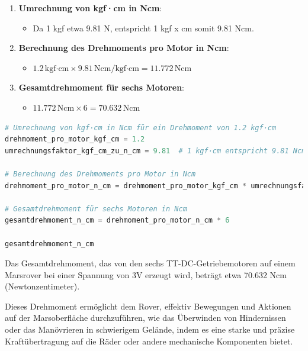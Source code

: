 \documentclass{vorlage-design-main}
\begin{document}
\begin{enumerate}
\def\labelenumi{\arabic{enumi}.}

\item
  \textbf{Umrechnung von kgf·cm in Ncm}:

  \begin{itemize}
  
  \item
    Da 1 kgf etwa 9.81 N, entspricht 1 kgf x cm somit 9.81 Ncm.
  \end{itemize}
\item
  \textbf{Berechnung des Drehmoments pro Motor in Ncm}:

  \begin{itemize}
  
  \item
    $1.2 \, \text{kgf·cm} \times 9.81 \, \text{Ncm/kgf·cm} = 11.772 \, \text{Ncm}$
  \end{itemize}
\item
  \textbf{Gesamtdrehmoment für sechs Motoren}:

  \begin{itemize}
  
  \item
    $11.772 \, \text{Ncm} \times 6 = 70.632 \, \text{Ncm}$
  \end{itemize}
\end{enumerate}

\begin{lstlisting}[language=Python]
# Umrechnung von kgf·cm in Ncm für ein Drehmoment von 1.2 kgf·cm
drehmoment_pro_motor_kgf_cm = 1.2
umrechnungsfaktor_kgf_cm_zu_n_cm = 9.81  # 1 kgf·cm entspricht 9.81 Ncm

# Berechnung des Drehmoments pro Motor in Ncm
drehmoment_pro_motor_n_cm = drehmoment_pro_motor_kgf_cm * umrechnungsfaktor_kgf_cm_zu_n_cm

# Gesamtdrehmoment für sechs Motoren in Ncm
gesamtdrehmoment_n_cm = drehmoment_pro_motor_n_cm * 6

gesamtdrehmoment_n_cm
\end{lstlisting}

Das Gesamtdrehmoment, das von den sechs TT-DC-Getriebemotoren auf einem
Marsrover bei einer Spannung von 3V erzeugt wird, beträgt etwa 70.632
Ncm (Newtonzentimeter).

Dieses Drehmoment ermöglicht dem Rover, effektiv Bewegungen und Aktionen
auf der Marsoberfläche durchzuführen, wie das Überwinden von
Hindernissen oder das Manövrieren in schwierigem Gelände, indem es eine
starke und präzise Kraftübertragung auf die Räder oder andere
mechanische Komponenten bietet.
\end{document}

